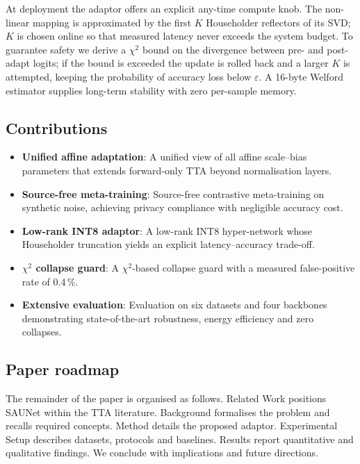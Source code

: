\documentclass{article}
\begin{document}
At deployment the adaptor offers an explicit any-time compute knob. The non-linear mapping is approximated by the first \(K\) Householder reflectors of its SVD; \(K\) is chosen online so that measured latency never exceeds the system budget. To guarantee safety we derive a \(\chi^2\) bound on the divergence between pre- and post-adapt logits; if the bound is exceeded the update is rolled back and a larger \(K\) is attempted, keeping the probability of accuracy loss below \(\varepsilon\). A 16-byte Welford estimator supplies long-term stability with zero per-sample memory.

\subsection{Contributions}
\begin{itemize}
  \item \textbf{Unified affine adaptation}: A unified view of all affine scale–bias parameters that extends forward-only TTA beyond normalisation layers.
  \item \textbf{Source-free meta-training}: Source-free contrastive meta-training on synthetic noise, achieving privacy compliance with negligible accuracy cost.
  \item \textbf{Low-rank INT8 adaptor}: A low-rank INT8 hyper-network whose Householder truncation yields an explicit latency–accuracy trade-off.
  \item \textbf{\texorpdfstring{$\chi^2$}{Chi-squared} collapse guard}: A \(\chi^2\)-based collapse guard with a measured false-positive rate of 0.4\,\%.
  \item \textbf{Extensive evaluation}: Evaluation on six datasets and four backbones demonstrating state-of-the-art robustness, energy efficiency and zero collapses.
\end{itemize}

\subsection{Paper roadmap}
The remainder of the paper is organised as follows. Related Work positions SAUNet within the TTA literature. Background formalises the problem and recalls required concepts. Method details the proposed adaptor. Experimental Setup describes datasets, protocols and baselines. Results report quantitative and qualitative findings. We conclude with implications and future directions.
\end{document}

